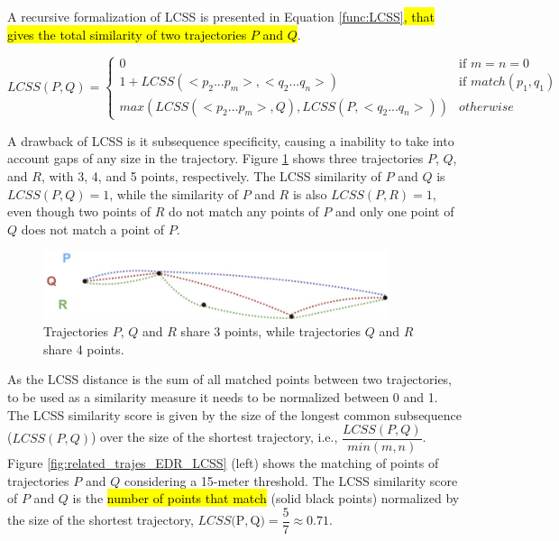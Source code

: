 \documentclass[12pt]{article}
\begin{document}
A recursive formalization of LCSS is presented in Equation \ref{func:LCSS}\hl{, that gives the total similarity of two trajectories $P$ and $Q$}.

\begin{equation}
\label{func:LCSS}
  LCSS(P, Q) = 
  \begin{cases} 
      0 & \text{if } m = n = 0\\ 
      1 + LCSS(<p_2...p_m>,<q_2...q_n>) & \text{if } match(p_1, q_1)\\
      max(LCSS(<p_2...p_m>, Q), LCSS(P, <q_2...q_n>)) & otherwise
  \end{cases}
\end{equation}

A drawback of LCSS is it subsequence specificity, causing a inability to take into account gaps of any size in the trajectory. Figure \ref{fig:related_trajes_PQR} shows three trajectories $P$, $Q$, and $R$, with 3, 4, and 5 points, respectively. The LCSS similarity of $P$ and $Q$ is $LCSS(P, Q) = 1$, while the similarity of $P$ and $R$ is also $LCSS(P, R) = 1$, even though two points of $R$ do not match any points of $P$ and only one point of $Q$ does not match a point of $P$.


\begin{figure}[h]
\centering
\includegraphics[width=0.9\textwidth]{Related_Works/related_trajes_PQR.jpg}
\caption{\label{fig:related_trajes_PQR}Trajectories $P$, $Q$ and $R$ share 3 points, while trajectories $Q$ and $R$ share 4 points.}
\end{figure}

As the LCSS distance is the sum of all matched points between two trajectories, to be used as a similarity measure it needs to be normalized between 0 and 1. The LCSS similarity score is given by the size of the longest common subsequence ($LCSS(P, Q)$) over the size of the shortest trajectory, i.e., $\dfrac{LCSS(P, Q)}{min(m, n)}$.
Figure \ref{fig:related_trajes_EDR_LCSS} (left) shows the matching of points of trajectories $P$ and $Q$ considering a 15-meter threshold. The LCSS similarity score of $P$ and $Q$ is the \hl{number of points that match} (solid black points) normalized by the size of the shortest trajectory, $LCSS($P$, $Q$) = \dfrac{5}{7} \approx 0.71$.
\end{document}
